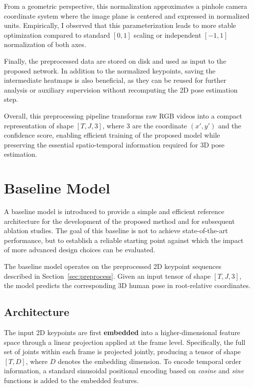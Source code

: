 From a geometric perspective, this normalization approximates a pinhole camera coordinate system where the image plane is centered and expressed in normalized units. Empirically, I observed that this 
parameterization leads to more stable optimization compared to standard $[0,1]$ scaling or independent $[-1,1]$ normalization of both axes.

Finally, the preprocessed data are stored on disk and used as input to the proposed network.
In addition to the normalized keypoints, saving the intermediate heatmaps is also beneficial, as they can be reused for further analysis or auxiliary supervision without recomputing the 2D pose estimation step.

Overall, this preprocessing pipeline transforms raw RGB videos into a compact representation of shape $[T, J, 3]$, where $3$ are the coordinate $(x',y')$ and the confidence score, enabling efficient training of the proposed model 
while preserving the essential spatio-temporal information required for 3D pose estimation.



\section{Baseline Model}
\label{sec:baseline}
A baseline model is introduced to provide a simple and efficient reference architecture for the development of the proposed method and for subsequent ablation studies.
The goal of this baseline is not to achieve state-of-the-art performance, but to establish a reliable starting point against which the impact of more advanced design 
choices can be evaluated.

The baseline model operates on the preprocessed 2D keypoint sequences described in Section~\ref{sec:preprocess}.
Given an input tensor of shape $[T, J, 3]$, the model predicts the corresponding 3D human pose in root-relative coordinates.

\subsection{Architecture}
The input 2D keypoints are first \textbf{embedded} into a higher-dimensional feature space through a linear projection applied at the frame level. Specifically, the full set of joints within each frame is projected jointly, producing a tensor of shape $[T, D]$, where $D$ denotes the embedding dimension.
To encode temporal order information, a standard sinusoidal positional encoding based on \textit{cosine} and \textit{sine} functions \cite{vaswani2017attention} is added to the embedded 
features.

